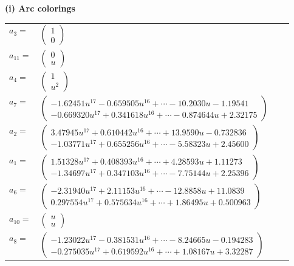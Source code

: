 \documentclass[1p]{elsarticle_modified}
\theoremstyle{definition}
\begin{document}
\flushleft \textbf{(i) Arc colorings}\\
\begin{tabular}{m{7pt} m{180pt} m{7pt} m{180pt} }
\flushright $a_{3}=$&$\begin{pmatrix}1\\0\end{pmatrix}$ \\
\flushright $a_{11}=$&$\begin{pmatrix}0\\u\end{pmatrix}$ \\
\flushright $a_{4}=$&$\begin{pmatrix}1\\u^2\end{pmatrix}$ \\
\flushright $a_{7}=$&$\begin{pmatrix}-1.62451 u^{17}-0.659505 u^{16}+\cdots-10.2030 u-1.19541\\-0.669320 u^{17}+0.341618 u^{16}+\cdots-0.874644 u+2.32175\end{pmatrix}$ \\
\flushright $a_{2}=$&$\begin{pmatrix}3.47945 u^{17}+0.610442 u^{16}+\cdots+13.9590 u-0.732836\\-1.03771 u^{17}+0.655256 u^{16}+\cdots-5.58323 u+2.45600\end{pmatrix}$ \\
\flushright $a_{1}=$&$\begin{pmatrix}1.51328 u^{17}+0.408393 u^{16}+\cdots+4.28593 u+1.11273\\-1.34697 u^{17}+0.347103 u^{16}+\cdots-7.75144 u+2.25396\end{pmatrix}$ \\
\flushright $a_{6}=$&$\begin{pmatrix}-2.31940 u^{17}+2.11153 u^{16}+\cdots-12.8858 u+11.0839\\0.297554 u^{17}+0.575634 u^{16}+\cdots+1.86495 u+0.500963\end{pmatrix}$ \\
\flushright $a_{10}=$&$\begin{pmatrix}u\\u\end{pmatrix}$ \\
\flushright $a_{8}=$&$\begin{pmatrix}-1.23022 u^{17}-0.381531 u^{16}+\cdots-8.24665 u-0.194283\\-0.275035 u^{17}+0.619592 u^{16}+\cdots+1.08167 u+3.32287\end{pmatrix}$ \\

\end{tabular}
\end{document}
